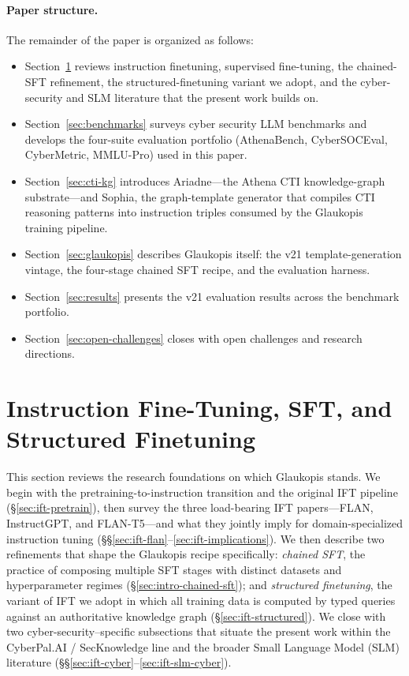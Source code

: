 \documentclass[unnumsec,webpdf,contemporary,large]{oup-authoring-template}
\theoremstyle{thmstyleone}
\theoremstyle{thmstyletwo}
\theoremstyle{thmstylethree}
\begin{document}
\paragraph{Paper structure.}
The remainder of the paper is organized as follows:
\begin{itemize}
  \item Section~\ref{sec:ift-slm} reviews instruction finetuning, supervised fine-tuning, the chained-SFT refinement, the structured-finetuning variant we adopt, and the cyber-security and SLM literature that the present work builds on.
  \item Section~\ref{sec:benchmarks} surveys cyber security LLM benchmarks and develops the four-suite evaluation portfolio (AthenaBench, CyberSOCEval, CyberMetric, MMLU-Pro) used in this paper.
  \item Section~\ref{sec:cti-kg} introduces Ariadne---the Athena CTI knowledge-graph substrate---and Sophia, the graph-template generator that compiles CTI reasoning patterns into instruction triples consumed by the Glaukopis training pipeline.
  \item Section~\ref{sec:glaukopis} describes Glaukopis itself: the v21 template-generation vintage, the four-stage chained SFT recipe, and the evaluation harness.
  \item Section~\ref{sec:results} presents the v21 evaluation results across the benchmark portfolio.
  \item Section~\ref{sec:open-challenges} closes with open challenges and research directions.
\end{itemize}

\section{Instruction Fine-Tuning, SFT, and Structured Finetuning}
\label{sec:ift-slm}

This section reviews the research foundations on which Glaukopis stands. We begin with the pretraining-to-instruction transition and the original IFT pipeline (\S\ref{sec:ift-pretrain}), then survey the three load-bearing IFT papers---FLAN, InstructGPT, and FLAN-T5---and what they jointly imply for domain-specialized instruction tuning (\S\S\ref{sec:ift-flan}--\ref{sec:ift-implications}). We then describe two refinements that shape the Glaukopis recipe specifically: \emph{chained SFT}, the practice of composing multiple SFT stages with distinct datasets and hyperparameter regimes (\S\ref{sec:intro-chained-sft}); and \emph{structured finetuning}, the variant of IFT we adopt in which all training data is computed by typed queries against an authoritative knowledge graph (\S\ref{sec:ift-structured}). We close with two cyber-security--specific subsections that situate the present work within the CyberPal.AI / SecKnowledge line and the broader Small Language Model (SLM) literature (\S\S\ref{sec:ift-cyber}--\ref{sec:ift-slm-cyber}).
\end{document}
